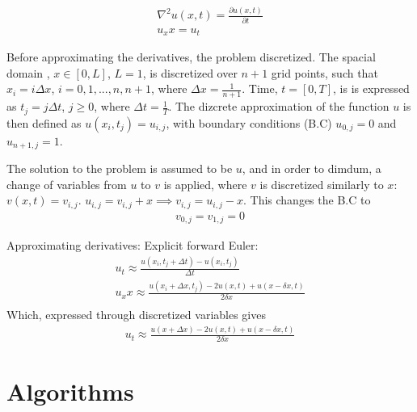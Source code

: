 \documentclass[%
oneside,                 %
final,                   %
10pt]{article}
\begin{document}
\begin{align}
\nabla^2u(x,t)=\frac{\partial u(x,t)}{\partial t} \\
u_xx=u_t
\end{align}


Before approximating the derivatives, the problem discretized. The spacial domain , $x \in [0,L]$, $L=1$, is discretized over $n+1$ grid points, such that $x_i=i \Delta x$, $i=0,1,...,n,n+1$, where $\Delta x= \frac{1}{n+1}$. Time, $t=[0,T]$, is is expressed as $t_j=j \Delta t$, $j\geq 0$, where $\Delta t=\frac{1}{T}$. The dizcrete approximation of the function $u$ is then defined as $u(x_i,t_j)=u_{i,j}$, with boundary conditions (B.C) $u_{0,j}=0$ and $u_{n+1,j}=1$. \newline

The solution to the problem is assumed to be $u$, and in order to dimdum, a change of variables from $u$ to $v$ is applied, where $v$ is discretized similarly to $x$: $v(x,t)=v_{i,j}$.  $u_{i,j}=v_{i,j}+x \implies v_{i,j}=u_{i,j}-x$. This changes the B.C to \begin{align*}
v_{0,j}=v_{1,j}=0
\end{align*}

Approximating derivatives:
Explicit forward Euler:
\begin{align}
u_t \approx \frac{u(x_i,t_j+\Delta t) -u(x_i,t_j)}{\Delta t} \\
u_xx \approx \frac{u(x_i+\Delta x,t_j) -2u(x,t)+u(x-\delta x,t)}{2\delta x}\\
\end{align}
Which, expressed through discretized variables gives
\begin{align}
u_t \approx \frac{u(x+\Delta x) -2u(x,t)+u(x-\delta x,t)}{2\delta x}
\end{align}


\section{Algorithms}
\label{sec:M.Algo}
\end{document}
